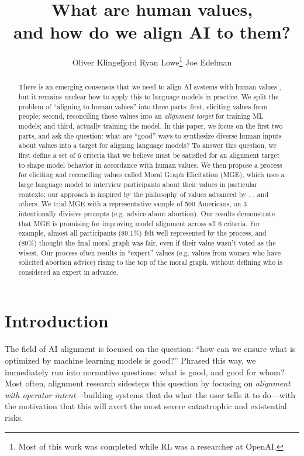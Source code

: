 \documentclass{article}
\title{What are human values,\\ and how do we align {AI} to them?}
\author{
    Oliver Klingefjord
    \And
    Ryan Lowe\thanks{Most of this work was completed while RL was a researcher at OpenAI.}    
    \And
    Joe Edelman
    \AND
    \normalfont{Meaning Alignment Institute}
}
\theoremstyle{definition}
\begin{document}
\setlength{\tabcolsep}{12pt} %
\renewcommand{\arraystretch}{2} %


\maketitle


\begin{abstract}
  There is an emerging consensus that we need to align AI systems with human values \citep{Gabriel:2020,ji2024ai}, but it remains unclear how to apply this to language models in practice. We split the problem of “aligning to human values” into three parts: first, eliciting values from people; second, reconciling those values into an \textit{alignment target} for training ML models; and third, actually training the model. In this paper, we focus on the first two parts, and ask the question: what are ``good'' ways to synthesize diverse human inputs about values into a target for aligning language models? To answer this question, we first define a set of 6 criteria that we believe must be satisfied for an alignment target to shape model behavior in accordance with human values. We then propose a process for eliciting and reconciling values called Moral Graph Elicitation (MGE), which uses a large language model to interview participants about their values in particular contexts; our approach is inspired by the philosophy of values advanced by \cite{Taylor1977}, \cite{Chang2004}, and others. We trial MGE with a representative sample of 500 Americans, on 3 intentionally divisive prompts (e.g. advice about abortion). Our results demonstrate that MGE is promising for improving model alignment across all 6 criteria. For example, almost all participants (89.1\%) felt well represented by the process, and (89\%) thought the final moral graph was fair, even if their value wasn’t voted as the wisest. Our process often results in “expert” values (e.g. values from women who have solicited abortion advice) rising to the top of the moral graph, without defining who is considered an expert in advance.
\end{abstract}


\section{Introduction}\label{sec:introduction}

The field of AI alignment is focused on the question: “how can we ensure what is optimized by machine learning models is good?” Phrased this way, we immediately run into normative questions: what is good, and good for whom? Most often, alignment research sidesteps this question by focusing on \textit{alignment with operator intent}—building systems that do what the user tells it to do—with the motivation that this will avert the most severe catastrophic and existential risks. 
\end{document}
